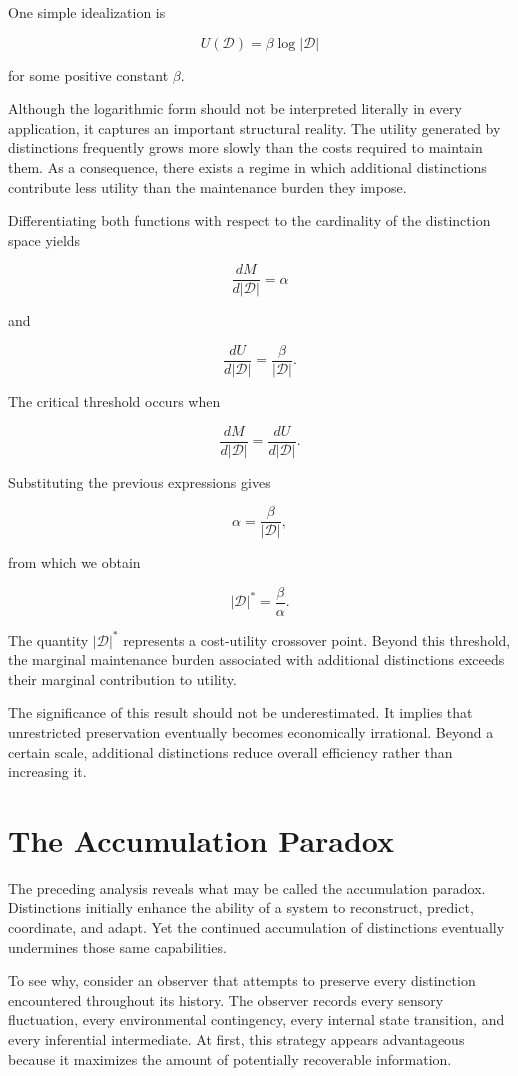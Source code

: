 \documentclass[12pt,oneside]{book}
\theoremstyle{plain} \newtheorem{theorem}{Theorem}[chapter] \newtheorem{lemma}[theorem]{Lemma} \newtheorem{proposition}[theorem]{Proposition} \newtheorem{corollary}[theorem]{Corollary}
\theoremstyle{definition} \newtheorem{definition}[theorem]{Definition} \newtheorem{axiom}[theorem]{Axiom} \newtheorem{construction}[theorem]{Construction}
\theoremstyle{remark} \newtheorem{remark}[theorem]{Remark} \newtheorem{example}[theorem]{Example}
\newcommand{\D}{\mathcal{D}} \newcommand{\R}{\mathcal{R}} \newcommand{\F}{\mathcal{F}} \newcommand{\U}{\mathcal{U}} \newcommand{\M}{\mathcal{M}} \newcommand{\G}{\Gamma}
\begin{document}
One simple idealization is

\[
U(\D)
=
\beta \log |\D|
\]

for some positive constant $\beta$.

Although the logarithmic form should not be interpreted literally in every application, it captures an important structural reality. The utility generated by distinctions frequently grows more slowly than the costs required to maintain them. As a consequence, there exists a regime in which additional distinctions contribute less utility than the maintenance burden they impose.

Differentiating both functions with respect to the cardinality of the distinction space yields

\[
\frac{dM}{d|\D|}
=
\alpha
\]

and

\[
\frac{dU}{d|\D|}
=
\frac{\beta}{|\D|}.
\]

The critical threshold occurs when

\[
\frac{dM}{d|\D|}
=
\frac{dU}{d|\D|}.
\]

Substituting the previous expressions gives

\[
\alpha
=
\frac{\beta}{|\D|},
\]

from which we obtain

\[
|\D|^{*}
=
\frac{\beta}{\alpha}.
\]

The quantity $|\D|^{*}$ represents a cost-utility crossover point. Beyond this threshold, the marginal maintenance burden associated with additional distinctions exceeds their marginal contribution to utility.

The significance of this result should not be underestimated. It implies that unrestricted preservation eventually becomes economically irrational. Beyond a certain scale, additional distinctions reduce overall efficiency rather than increasing it.

\section{The Accumulation Paradox}

The preceding analysis reveals what may be called the accumulation paradox. Distinctions initially enhance the ability of a system to reconstruct, predict, coordinate, and adapt. Yet the continued accumulation of distinctions eventually undermines those same capabilities.

To see why, consider an observer that attempts to preserve every distinction encountered throughout its history. The observer records every sensory fluctuation, every environmental contingency, every internal state transition, and every inferential intermediate. At first, this strategy appears advantageous because it maximizes the amount of potentially recoverable information.
\end{document}
